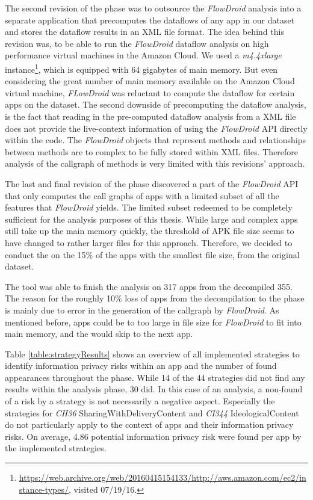 The second revision of the \sca phase was to outsource the \textit{FlowDroid} analysis into a separate application that precomputes the dataflows of any app in our dataset and stores the dataflow results in an \acs{XML} file format.
The idea behind this revision was, to be able to run the \textit{FlowDroid} dataflow analysis on high performance virtual machines in the Amazon Cloud.
We used a \textit{m4.4xlarge} instance\footnote{\url{https://web.archive.org/web/20160415154133/http://aws.amazon.com/ec2/instance-types/}, visited 07/19/16.}, which is equipped with 64 gigabytes of main memory.
But even considering the great number of main memory available on the Amazon Cloud virtual machine, \textit{FLowDroid} was reluctant to compute the dataflow for certain apps on the dataset.
The second downside of precomputing the dataflow analysis, is the fact that reading in the pre-computed dataflow analysis from a XML file does not provide the live-context information of using the \textit{FlowDroid} API directly within the code.
The \textit{FlowDroid} objects that represent methods and relationships between methods are to complex to be fully stored within XML files.
Therefore analysis of the callgraph of methods is very limited with this revisions' approach.

The last and final revision of the \sca phase discovered a part of the \textit{FlowDroid} API that only computes the call graphs of apps with a limited subset of all the features that \textit{FlowDroid} yields.
The limited subset redeemed to be completely sufficient for the analysis purposes of this thesis.
While large and complex apps still take up the main memory quickly, the threshold of APK file size seems to have changed to rather larger files for this approach.
Therefore, we decided to conduct the \sca on the 15\% of the apps with the smallest file size, from the original dataset.

The \sca tool was able to finish the analysis on 317 apps from the decompiled 355.
The reason for the roughly 10\% loss of apps from the decompilation to the \sca phase is mainly due to error in the generation of the callgraph by \textit{FlowDroid}.
As mentioned before, apps could be to too large in file size for \textit{FlowDroid} to fit into main memory, and the \sca would skip to the next app.

Table \ref{table:strategyResults} shows an overview of all implemented strategies to identify information privacy risks within an app and the number of found appearances throughout the \sca phase.
While 14 of the 44 strategies did not find any results within the analysis phase, 30 did.
In this case of an \ipr analysis, a non-found of a risk by a strategy is not necessarily a negative aspect.
Especially the strategies for \textit{CH36} SharingWithDeliveryContent and \textit{CI344} IdeologicalContent do not particularly apply to the context of \mH apps and their information privacy risks.
On average, 4.86 potential information privacy risk were found per app by the implemented strategies.

